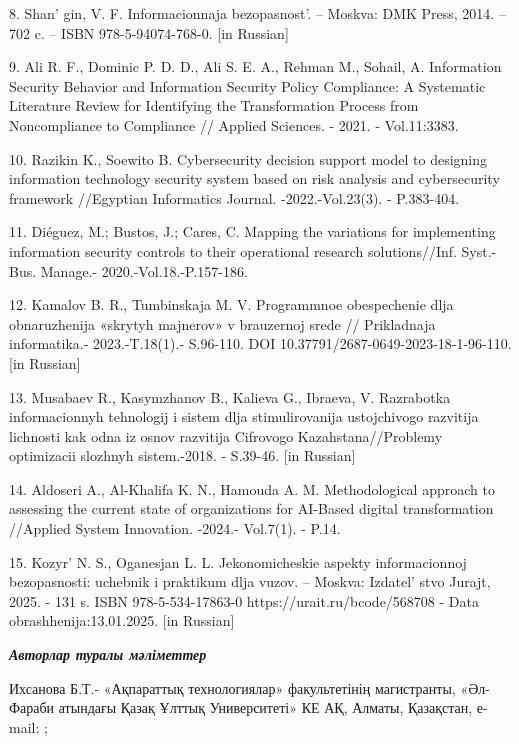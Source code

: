 8. Shan' gin, V. F. Informacionnaja
bezopasnost'. -- Moskva: DMK Press, 2014. -- 702 c. --
ISBN 978-5-94074-768-0. {[}in Russian{]}

9. Ali R. F., Dominic P. D. D., Ali S. E. A., Rehman M., Sohail, A.
Information Security Behavior and Information Security Policy
Compliance: A Systematic Literature Review for Identifying the
Transformation Process from Noncompliance to Compliance // Applied
Sciences. - 2021. - Vol.11:3383.
\href{https://doi.org/10.3390/app11083383}{}

10. Razikin K., Soewito B. Cybersecurity decision support model to
designing information technology security system based on risk analysis
and cybersecurity framework //Egyptian Informatics Journal.
-2022.-Vol.23(3). - P.383-404.
\href{https://doi.org/10.1016/j.eij.2022.03.001}{}

11. Diéguez, M.; Bustos, J.; Cares, C. Mapping the variations for
implementing information security controls to their operational research
solutions//Inf. Syst.-Bus. Manage.- 2020.-Vol.18.-P.157-186.
~\href{https://doi.org/10.1007/s10257-020-00470-8}{}

12. Kamalov B. R., Tumbinskaja M. V. Programmnoe obespechenie dlja
obnaruzhenija «skrytyh majnerov» v brauzernoj srede // Prikladnaja
informatika.- 2023.-T.18(1).- S.96-110. DOI
10.37791/2687-0649-2023-18-1-96-110. {[}in Russian{]}

13. Musabaev R., Kasymzhanov B., Kalieva G., Ibraeva, V. Razrabotka
informacionnyh tehnologij i sistem dlja stimulirovanija ustojchivogo
razvitija lichnosti kak odna iz osnov razvitija Cifrovogo
Kazahstana//Problemy optimizacii slozhnyh sistem.-2018. - S.39-46.
{[}in Russian{]}

14. Aldoseri A., Al-Khalifa K. N., Hamouda A. M. Methodological approach
to assessing the current state of organizations for AI-Based digital
transformation //Applied System Innovation. -2024.- Vol.7(1). - P.14.
\href{https://doi.org/10.3390/asi7010014}{}

15. Kozyr'{} N. S., Oganesjan L. L. Jekonomicheskie
aspekty informacionnoj bezopasnosti: uchebnik i praktikum dlja vuzov. --
Moskva: Izdatel' stvo Jurajt, 2025. - 131 s. ISBN
978-5-534-17863-0 https://urait.ru/bcode/568708 - Data
obrashhenija:13.01.2025. {[}in Russian{]}

\emph{{\bfseries Авторлар туралы мәліметтер}}

Ихсанова Б.Т.- «Ақпараттық технологиялар» факультетінің магистранты,
«Әл-Фараби атындағы Қазақ Ұлттық Университеті» КЕ АҚ, Алматы, Қазақстан,
е-mail:
\href{mailto:botagozikhsanova@gmail.com}{};

